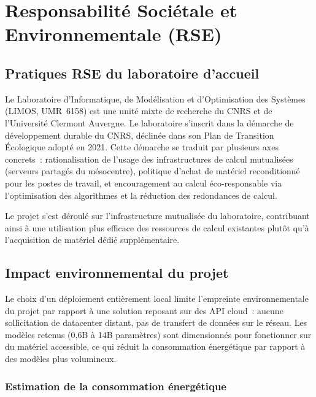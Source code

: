 \documentclass[11pt,a4paper]{article}
\begin{document}
\section{Responsabilité Sociétale et Environnementale (RSE)}
\label{sec:rse}

\subsection{Pratiques RSE du laboratoire d'accueil}

Le Laboratoire d'Informatique, de Modélisation et d'Optimisation des Systèmes (LIMOS, UMR~6158) est une unité mixte de recherche du CNRS et de l'Université Clermont Auvergne. Le laboratoire s'inscrit dans la démarche de développement durable du CNRS, déclinée dans son Plan de Transition Écologique adopté en 2021. Cette démarche se traduit par plusieurs axes concrets~: rationalisation de l'usage des infrastructures de calcul mutualisées (serveurs partagés du mésocentre), politique d'achat de matériel reconditionné pour les postes de travail, et encouragement au calcul éco-responsable via l'optimisation des algorithmes et la réduction des redondances de calcul.

Le projet s'est déroulé sur l'infrastructure mutualisée du laboratoire, contribuant ainsi à une utilisation plus efficace des ressources de calcul existantes plutôt qu'à l'acquisition de matériel dédié supplémentaire.

\subsection{Impact environnemental du projet}

Le choix d'un déploiement entièrement local limite l'empreinte environnementale du projet par rapport à une solution reposant sur des API cloud~: aucune sollicitation de datacenter distant, pas de transfert de données sur le réseau. Les modèles retenus (0,6B à 14B paramètres) sont dimensionnés pour fonctionner sur du matériel accessible, ce qui réduit la consommation énergétique par rapport à des modèles plus volumineux.

\subsubsection{Estimation de la consommation énergétique}
\end{document}
